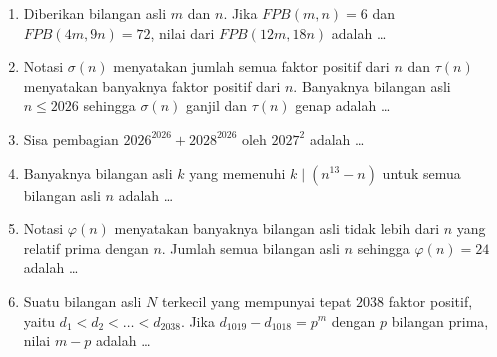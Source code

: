 \documentclass[12pt]{scrartcl}
\begin{document}
\begin{enumerate}

	\item Diberikan bilangan asli $m$ dan $n$. Jika $FPB(m, n) = 6$ dan
	$FPB(4m, 9n) = 72$, nilai dari $FPB(12m, 18n)$ adalah \dots

	\item Notasi $\sigma(n)$ menyatakan jumlah semua faktor positif dari $n$
	dan $\tau(n)$ menyatakan banyaknya faktor positif dari $n$.
	Banyaknya bilangan asli $n \le 2026$ sehingga $\sigma(n)$ ganjil
	dan $\tau(n)$ genap adalah \dots

	\item Sisa pembagian $2026^{2026} + 2028^{2026}$ oleh $2027^2$ adalah \dots

	\item Banyaknya bilangan asli $k$ yang memenuhi $k \mid (n^{13} - n)$
	untuk semua bilangan asli $n$ adalah \dots

	\item Notasi $\varphi(n)$ menyatakan banyaknya bilangan asli tidak lebih dari $n$
	yang relatif prima dengan $n$.
	Jumlah semua bilangan asli $n$ sehingga $\varphi(n) = 24$ adalah \dots

	\item Suatu bilangan asli $N$ terkecil yang mempunyai tepat $2038$ faktor positif,
	yaitu $d_1 < d_2 < \dots < d_{2038}$.
	Jika $d_{1019} - d_{1018} = p^m$ dengan $p$ bilangan prima,
	nilai $m - p$ adalah \dots

\end{enumerate}
\end{document}
